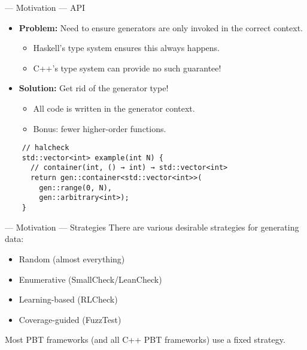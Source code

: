 \begin{frame}[fragile]{\halcheck{} --- Motivation --- API}
  \begin{itemize}
    \item \textbf{Problem:} Need to ensure generators are only invoked in the correct context.
          \begin{itemize}
            \item Haskell's type system ensures this always happens.
            \item C++'s type system can provide no such guarantee!
          \end{itemize}
          \pause{}
    \item \textbf{Solution:} Get rid of the generator type!
          \begin{itemize}
            \item All code is written in the generator context.
            \item Bonus: fewer higher-order functions.
          \end{itemize}
  \end{itemize}

  \begin{verbatim}
    // halcheck
    std::vector<int> example(int N) {
      // container(int, () → int) → std::vector<int>
      return gen::container<std::vector<int>>(
        gen::range(0, N),
        gen::arbitrary<int>);
    }
  \end{verbatim}
\end{frame}


\begin{frame}{\halcheck{} --- Motivation --- Strategies}
  There are various desirable strategies for generating data:
  \begin{itemize}
    \item Random (almost everything)
    \item Enumerative (SmallCheck/LeanCheck) \pause{}
    \item Learning-based (RLCheck)
    \item Coverage-guided (FuzzTest) \pause{}
  \end{itemize}

  Most PBT frameworks (and all C++ PBT frameworks) use a \alert{fixed strategy}.
\end{frame}

